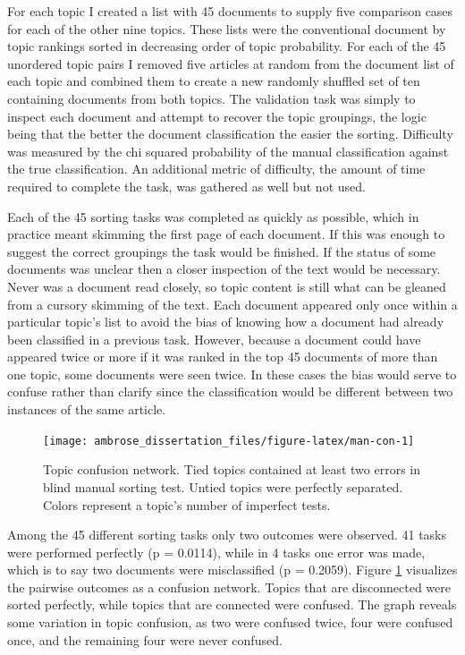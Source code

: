 \documentclass[]{book}
\theoremstyle{definition}
\theoremstyle{definition}
\theoremstyle{definition}
\theoremstyle{remark}
\begin{document}
For each topic I created a list with 45 documents to supply five
comparison cases for each of the other nine topics. These lists were the
conventional document by topic rankings sorted in decreasing order of
topic probability. For each of the 45 unordered topic pairs I removed
five articles at random from the document list of each topic and
combined them to create a new randomly shuffled set of ten containing
documents from both topics. The validation task was simply to inspect
each document and attempt to recover the topic groupings, the logic
being that the better the document classification the easier the
sorting. Difficulty was measured by the chi squared probability of the
manual classification against the true classification. An additional
metric of difficulty, the amount of time required to complete the task,
was gathered as well but not used.

Each of the 45 sorting tasks was completed as quickly as possible, which
in practice meant skimming the first page of each document. If this was
enough to suggest the correct groupings the task would be finished. If
the status of some documents was unclear then a closer inspection of the
text would be necessary. Never was a document read closely, so topic
content is still what can be gleaned from a cursory skimming of the
text. Each document appeared only once within a particular topic's list
to avoid the bias of knowing how a document had already been classified
in a previous task. However, because a document could have appeared
twice or more if it was ranked in the top 45 documents of more than one
topic, some documents were seen twice. In these cases the bias would
serve to confuse rather than clarify since the classification would be
different between two instances of the same article.

\begin{figure}

{\centering \texttt{[image: ambrose\_dissertation\_files/figure-latex/man-con-1]} 

}

\caption{Topic confusion network. Tied topics contained at least two errors in blind manual sorting test. Untied topics were perfectly separated. Colors represent a topic's number of imperfect tests.}\label{fig:man-con}
\end{figure}

Among the 45 different sorting tasks only two outcomes were observed. 41
tasks were performed perfectly (p = 0.0114), while in 4 tasks one error
was made, which is to say two documents were misclassified (p = 0.2059).
Figure \ref{fig:man-con} visualizes the pairwise outcomes as a confusion
network. Topics that are disconnected were sorted perfectly, while
topics that are connected were confused. The graph reveals some
variation in topic confusion, as two were confused twice, four were
confused once, and the remaining four were never confused.
\end{document}
